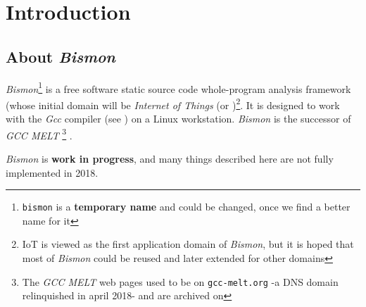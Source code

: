\section{Introduction}

\subsection{About \textit{Bismon}}

\textit{Bismon}\footnote{\texttt{bismon} is a \textbf{temporary name}
  and could be changed, once we find a better name for it} is a free
software static source code whole-program analysis framework (whose
initial domain will be \emph{Internet of Things} (or
)\footnote{IoT is viewed as the first application
  domain of \textit{Bismon}, but it is hoped that most of
  \textit{Bismon} could be reused and later extended for other
  domains}. It is designed to work with the \textit{Gcc} compiler (see
) on a Linux workstation. \textit{Bismon} is the
successor of \textit{GCC MELT} \footnote{The \textit{GCC MELT} web
  pages used to be on \texttt{gcc-melt.org} -a DNS domain relinquished
  in april 2018- and are archived on
  } \cite{Starynkevitch2007Multistage, starynkevitch-DSL2011}.

\textit{Bismon} is \textbf{work in progress}, and many things
described here are not fully implemented in 2018.



